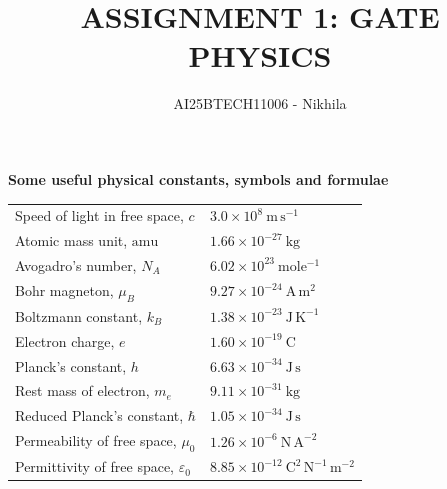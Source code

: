 \documentclass[journal,12pt,onecolumn]{IEEEtran}
\begin{document}
\title{
ASSIGNMENT 1: GATE PHYSICS }

\author{AI25BTECH11006 - Nikhila }
\maketitle

\vspace{6em} 



\noindent\textbf{\large Some useful physical constants, symbols and formulae}


\vspace{6em}

\begin{tabular}{ l l }
Speed of light in free space, $c$ & $3.0 \times 10^8\ \mathrm{m\,s^{-1}}$ \\
Atomic mass unit, $\mathrm{amu}$ & $1.66 \times 10^{-27}\ \mathrm{kg}$ \\
Avogadro's number, $N_A$ & $6.02 \times 10^{23}\ \mathrm{mole^{-1}}$ \\
Bohr magneton, $\mu_B$ & $9.27 \times 10^{-24}\ \mathrm{A\,m^2}$ \\
Boltzmann constant, $k_B$ & $1.38 \times 10^{-23}\ \mathrm{J\,K^{-1}}$ \\
Electron charge, $e$ & $1.60 \times 10^{-19}\ \mathrm{C}$ \\
Planck's constant, $h$ & $6.63 \times 10^{-34}\ \mathrm{J\,s}$ \\
Rest mass of electron, $m_e$ & $9.11 \times 10^{-31}\ \mathrm{kg}$ \\
Reduced Planck's constant, $\hbar$ & $1.05 \times 10^{-34}\ \mathrm{J\,s}$ \\
Permeability of free space, $\mu_0$ & $1.26 \times 10^{-6}\ \mathrm{N\,A^{-2}}$ \\
Permittivity of free space, $\varepsilon_0$ & $8.85 \times 10^{-12}\ \mathrm{C^2\,N^{-1}\,m^{-2}}$
\end{tabular}




\newpage
\end{document}
